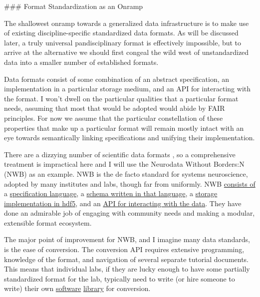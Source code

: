 \documentclass[11pt]{article}
\begin{document}
\begin{multicols}{2}
 \#\#\# Format Standardization as an Onramp

The shallowest onramp towards a generalized data infrastructure is to
make use of existing discipline-specific standardized data formats. As
will be discussed later, a truly universal pandisciplinary format is
effectively impossible, but to arrive at the alternative we should first
congeal the wild west of unstandardized data into a smaller number of
established formats.

Data formats consist of some combination of an abstract specification,
an implementation in a particular storage medium, and an API for
interacting with the format. I won't dwell on the particular qualities
that a particular format needs, assuming that most that would be adopted
would abide by FAIR principles. For now we assume that the particular
constellation of these properties that make up a particular format will
remain mostly intact with an eye towards semantically linking
specifications and unifying their implementation.

There are a dizzying number of scientific data formats \cite{teamScientificDataFormats} , so a comprehensive treatment is
impractical here and I will use the Neurodata Without Borders:N
(NWB)\cite{rubelNWBAccessibleData2019a}  as an example. NWB is
the de facto standard for systems neuroscience, adopted by many
institutes and labs, though far from uniformly. NWB
\href{https://www.nwb.org/nwb-software/}{consists of} a
\href{https://schema-language.readthedocs.io/en/stable/}{specification
language}, a \href{https://nwb-schema.readthedocs.io/en/stable/}{schema
written in that language}, a
\href{https://nwb-storage.readthedocs.io/en/stable/}{storage
implementation in hdf5}, and an
\href{https://pynwb.readthedocs.io/en/stable/}{API for interacting with
the data}. They have done an admirable job of engaging with community
needs \cite{rubelNeurodataBordersEcosystem2021}  and making a
modular, extensible format ecosystem.

The major point of improvement for NWB, and I imagine many data
standards, is the ease of conversion. The conversion API requires
extensive programming, knowledge of the format, and navigation of
several separate tutorial documents. This means that individual labs, if
they are lucky enough to have some partially standardized format for the
lab, typically need to write (or hire someone to write) their own
\href{https://github.com/catalystneuro/tank-lab-to-nwb}{software}
\href{https://github.com/catalystneuro/mease-lab-to-nwb}{library} for
conversion.


\end{multicols}
\end{document}
